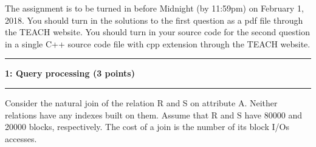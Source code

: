 \documentclass[11pt]{article}
\newcommand\question[2]{\vspace{.25in}\hrule\textbf{#1: #2}\vspace{.5em}\hrule\vspace{.10in}}
\begin{document}
\raggedright
\newcommand\NAME{Nicholas Jake Jeffreys}  %
\newcommand\ANDREWID{932-221-702}     %
\newcommand\HWNUM{3}              %


The assignment is to be turned in before Midnight (by 11:59pm) on February 1, 2018.
You should turn in the solutions to the first question as a pdf file through the TEACH website. You should turn in your source code
for the second question in a single C++ source code file with cpp extension through the TEACH website.

\question{1}{Query processing (3 points)}
Consider the natural join of the relation R and S on attribute A.
Neither relations have any indexes built on them.
Assume that R and S have 80000 and 20000 blocks, respectively.
The cost of a join is the number of its block I/Os accesses.
\end{document}

